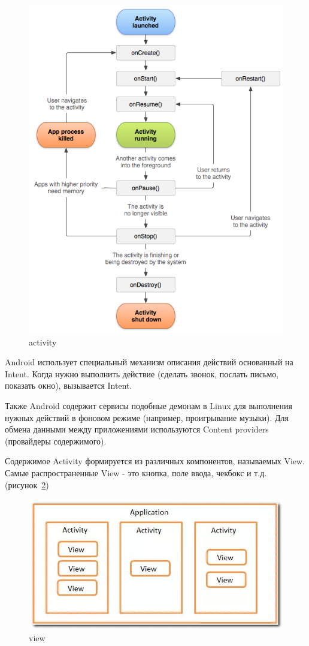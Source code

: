 \begin{figure}[H]
	\centering
	\includegraphics[width=0.6\linewidth]{pics/activity}
	\caption{activity}
	\label{fig:activity}
\end{figure}

Android использует специальный механизм описания действий основанный на Intent. Когда нужно выполнить действие (сделать звонок, послать письмо, показать окно), вызывается Intent.

Также Android содержит сервисы подобные демонам в Linux для выполнения нужных действий в фоновом режиме (например, проигрывание музыки).
Для обмена данными между приложениями используются Content providers (провайдеры содержимого).

Содержимое Activity формируется из различных компонентов, называемых View. Самые распространенные View - это кнопка, поле ввода, чекбокс и т.д. (рисунок~\ref{fig:view})

\begin{figure}[H]
	\centering
	\includegraphics[width=0.6\linewidth]{pics/view}
	\caption{view}
	\label{fig:view}
\end{figure}

